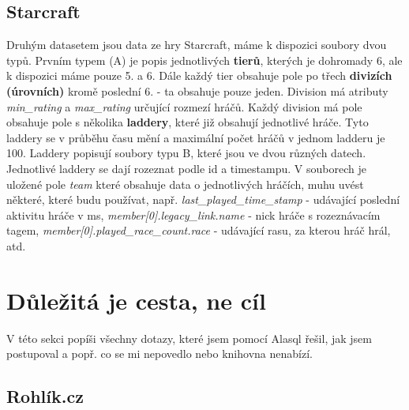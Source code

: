 \documentclass[a4, titlepage]{article}
\begin{document}
\subsection{Starcraft}
Druhým datasetem jsou data ze hry Starcraft, máme k dispozici soubory dvou typů. Prvním typem (A) je popis jednotlivých \textbf{tierů}, kterých je dohromady 6, ale k dispozici máme pouze 5. a 6. Dále každý tier obsahuje pole po třech \textbf{divizích (úrovních)} kromě poslední 6. - ta obsahuje pouze jeden. Division má atributy \textit{min\_rating} a \textit{max\_rating} určující rozmezí hráčů. Každý division má pole  obsahuje pole s několika \textbf{laddery}, které již obsahují jednotlivé hráče. Tyto laddery se v průběhu času mění a maximální počet hráčů v jednom ladderu je 100. Laddery popisují soubory typu B, které jsou ve dvou různých datech. Jednotlivé laddery se dají rozeznat podle id a timestampu. V souborech je uložené pole \textit{team} které obsahuje data o jednotlivých hráčích, muhu uvést některé, které budu používat, např. \textit{last\_played\_time\_stamp} - udávající poslední aktivitu hráče v ms, \textit{member[0].legacy\_link.name} - nick hráče s rozeznávacím tagem, \textit{member[0].played\_race\_count.race} - udávající rasu, za kterou hráč hrál, atd.

\section{Důležitá je cesta, ne cíl}
V této sekci popíši všechny dotazy, které jsem pomocí Alasql řešil, jak jsem postupoval a popř. co se mi nepovedlo nebo knihovna nenabízí. 

\subsection{Rohlík.cz}
\end{document}
